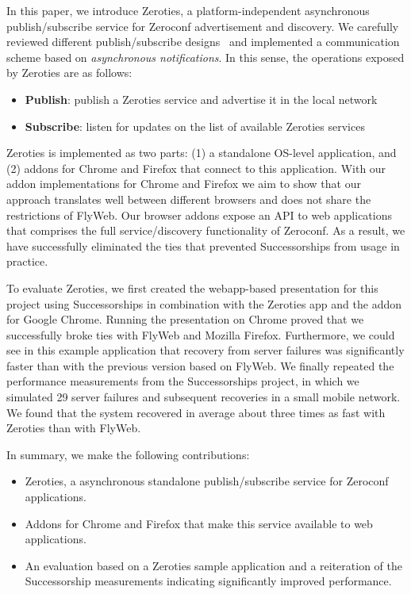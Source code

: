 In this paper, we introduce Zeroties, a platform-independent asynchronous publish/subscribe service for Zeroconf advertisement and discovery.
We carefully reviewed different publish/subscribe designs~\cite{eugster_2003} and implemented a communication scheme based on \textit{asynchronous notifications}.
In this sense, the operations exposed by Zeroties are as follows:
\begin{itemize}
    \item \textbf{Publish}: publish a Zeroties service and advertise it in the local network
    \item \textbf{Subscribe}: listen for updates on the list of available Zeroties services
\end{itemize}

Zeroties is implemented as two parts: (1) a standalone OS-level application, and (2) addons for Chrome and Firefox that connect to this application.
With our addon implementations for Chrome and Firefox we aim to show that our approach translates well between different browsers and does not share the restrictions of FlyWeb.
Our browser addons expose an API to web applications that comprises the full service/discovery functionality of Zeroconf.
As a result, we have successfully eliminated the ties that prevented Successorships from usage in practice.

To evaluate Zeroties, we first created the webapp-based presentation for this project using Successorships in combination with the Zeroties app and the addon for Google Chrome.
Running the presentation on Chrome proved that we successfully broke ties with FlyWeb and Mozilla Firefox.
Furthermore, we could see in this example application that recovery from server failures was significantly faster than with the previous version based on FlyWeb.
We finally repeated the performance measurements from the Successorships project, in which we simulated 29 server failures and subsequent recoveries in a small mobile network.
We found that the system recovered in average about three times as fast with Zeroties than with FlyWeb.

In summary, we make the following contributions:
\begin{itemize}
    \item Zeroties, a asynchronous standalone publish/subscribe service for Zeroconf applications.
    \item Addons for Chrome and Firefox that make this service available to web applications.
    \item An evaluation based on a Zeroties sample application and a reiteration of the Successorship measurements indicating significantly improved performance.
\end{itemize}


